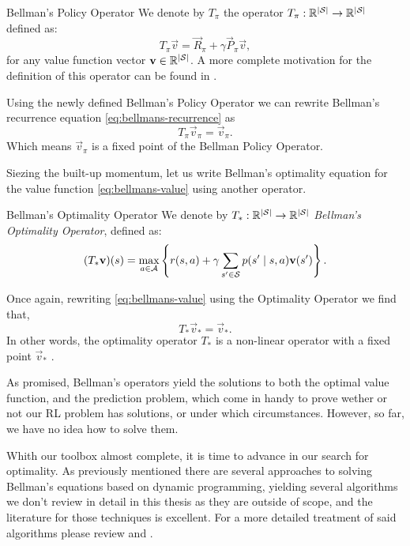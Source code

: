 \begin{dfn}{Bellman's Policy Operator}{}
    We denote by $T_\pi$ the operator $T_\pi: \mathbb{R}^{|\mathcal{S}|} \to \mathbb{R}^{|\mathcal{S}|}$ defined as:
    \begin{equation*}
        T_\pi \vec{v} = \vec{R}_\pi + \gamma \vec{P}_\pi \vec{v},
    \end{equation*}
    for any value function vector $\mathbf{v} \in \mathbb{R}^{|\mathcal{S}|}$. A more complete
    motivation for the definition of this operator can be found in
    \cite[Ch.~5.4]{raoRL4F}.
\end{dfn}

Using the newly defined Bellman's Policy Operator we can rewrite Bellman's
recurrence equation \eqref{eq:bellmans-recurrence} as
\begin{equation*}
    T_\pi \vec{v}_\pi = \vec{v}_\pi.
\end{equation*}
Which means $\vec{v}_\pi$ is a fixed point of the Bellman Policy Operator.

Siezing the built-up momentum, let us write Bellman's optimality equation for the value function \eqref{eq:bellmans-value} using another operator.

\begin{dfn}{Bellman's Optimality Operator}{}
    We denote by $T_*: \mathbb{R}^{|\mathcal{S}|} \to \mathbb{R}^{|\mathcal{S}|}$ \emph{Bellman's Optimality Operator}, defined as:
    \begin{equation*}
        (T_{*} \mathbf{v})(s) = \max_{a \in \mathcal{A}} \left\{ r(s, a) + \gamma \sum_{s' \in \mathcal{S}} p(s' \mid s, a) \mathbf{v}(s') \right\}. 
    \end{equation*}
\end{dfn}

Once again, rewriting \eqref{eq:bellmans-value} using the Optimality Operator we
find that,
\begin{equation}
    \label{eq:bellmans-optimality-operators}
    T_* \vec{v}_{*} = \vec{v}_{*}.
\end{equation}
In other words, the optimality operator $T_*$ is a non-linear operator with a
fixed point $\vec{v}_*$ \cite[Lect. Jan 15 2019]{rao2022}.

As promised, Bellman's operators yield the solutions to both the optimal value
function, and the prediction problem, which come in handy to prove wether or
not our RL problem has solutions, or under which circumstances. However, so far,
we have no idea how to solve them.

Whith our toolbox almost complete, it is time to advance in our search for
optimality. As previously mentioned there are several approaches to solving
Bellman's equations based on dynamic programming, yielding several algorithms we
don't review in detail in this thesis as they are outside of scope, and the
literature for those techniques is excellent. For a more detailed treatment of
said algorithms please review \cite{SuttonBarto} and \cite{raoRL4F}.

